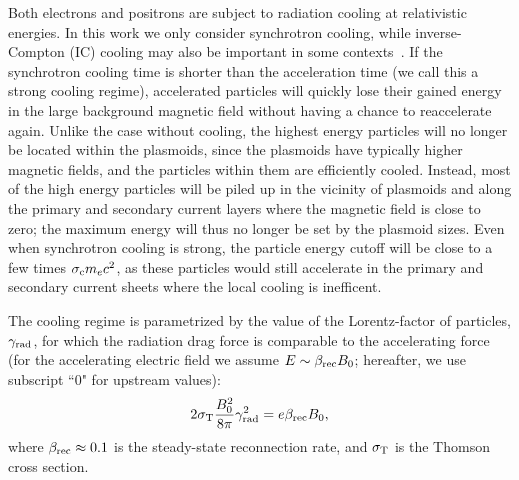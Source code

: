 Both electrons and positrons are subject to radiation cooling at relativistic energies. In this work we only consider synchrotron cooling, while  inverse-Compton (IC) cooling may also be important in some contexts~\citep{2018arXiv180501910W}. If the synchrotron cooling time is shorter than the acceleration time (we call this a strong cooling regime), accelerated particles will quickly lose their gained energy in the large background magnetic field without having a chance to reaccelerate again. Unlike the case without cooling, the highest energy particles will no longer be located within the plasmoids, since the plasmoids have typically higher magnetic fields, and the particles within them are efficiently cooled. Instead, most of the high energy particles will be piled up in the vicinity of plasmoids and along the primary and secondary current layers where the magnetic field is close to zero; the maximum energy will thus no longer be set by the plasmoid sizes. Even when synchrotron cooling is strong, the particle energy cutoff will be close to a few times $\sigma_{\rm c}m_e c^2$, as these particles would still accelerate in the primary and secondary current sheets where the local cooling is inefficent.



The cooling regime is parametrized by the value of the Lorentz-factor of particles, $\gamma_{\rm rad}$, for which the radiation drag force is comparable to the accelerating force (for the accelerating electric field we assume $E \sim \beta_{\rm rec} B_0$; hereafter, we use subscript ``0" for upstream values):
\begin{equation}
    \label{eq:def_gammarad}
    2\sigma_{\rm T}\frac{B_0^2}{8\pi}\gamma_{\rm rad}^2 = e\beta_{\rm rec}B_0,
\end{equation}
where $\beta_{\rm rec}\approx 0.1$ is the steady-state reconnection rate, and $\sigma_{\rm T}$ is the Thomson cross section.


